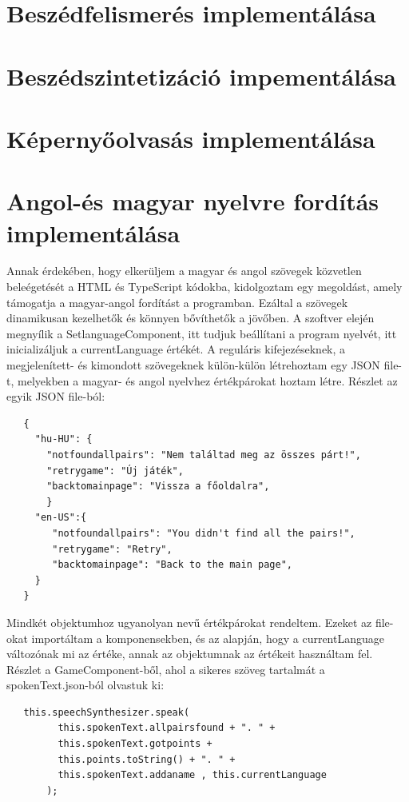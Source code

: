 \documentclass[12pt]{report}
\begin{document}
\section{Beszédfelismerés implementálása}
\section{Beszédszintetizáció impementálása}
\section{Képernyőolvasás implementálása}
\pagebreak
\section{Angol-és magyar nyelvre fordítás implementálása}
Annak érdekében, hogy elkerüljem a magyar és angol szövegek közvetlen beleégetését a HTML és TypeScript kódokba, kidolgoztam egy megoldást, amely támogatja a magyar-angol fordítást a programban. Ezáltal a szövegek dinamikusan kezelhetők és könnyen bővíthetők a jövőben. A szoftver elején megnyílik a SetlanguageComponent, itt tudjuk beállítani a program nyelvét, itt inicializáljuk a currentLanguage értékét.
\newline
A reguláris kifejezéseknek, a megjelenített- és kimondott szövegeknek külön-külön létrehoztam egy JSON file-t, melyekben a magyar- és angol nyelvhez értékpárokat hoztam létre.
\newline
Részlet az egyik JSON file-ból:
\begin{verbatim}
   {
     "hu-HU": {
       "notfoundallpairs": "Nem találtad meg az összes párt!",
       "retrygame": "Új játék",
       "backtomainpage": "Vissza a főoldalra",
       }
     "en-US":{
        "notfoundallpairs": "You didn't find all the pairs!",
        "retrygame": "Retry",
        "backtomainpage": "Back to the main page",
     }
   }
\end{verbatim}
\newline
Mindkét objektumhoz ugyanolyan nevű értékpárokat rendeltem. Ezeket az file-okat importáltam a komponensekben, és az alapján, hogy a currentLanguage változónak mi az értéke, annak az objektumnak az értékeit használtam fel.
\newline
Részlet a GameComponent-ből, ahol a sikeres szöveg tartalmát a spokenText.json-ból olvastuk ki:
\begin{verbatim}
   this.speechSynthesizer.speak(
         this.spokenText.allpairsfound + ". " +
         this.spokenText.gotpoints +
         this.points.toString() + ". " +
         this.spokenText.addaname , this.currentLanguage
       );
\end{verbatim}
\end{document}
